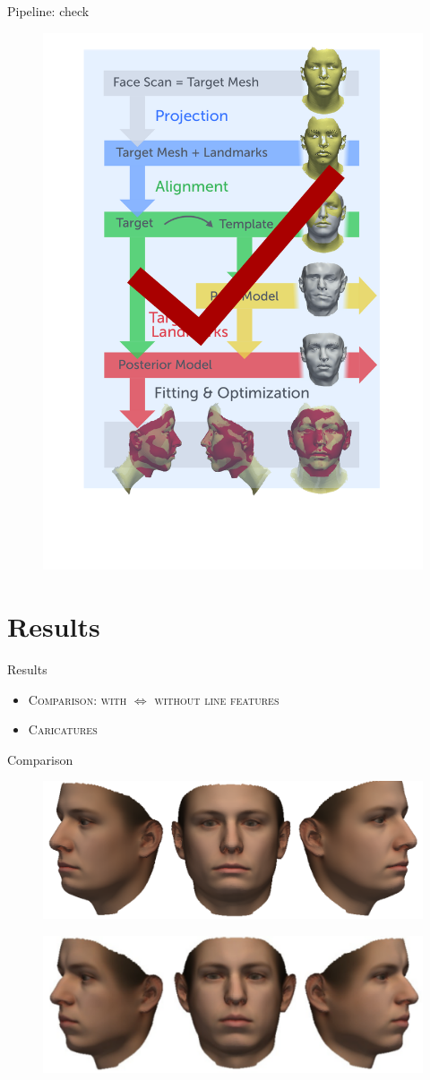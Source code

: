 \documentclass[xcolor=x11names,compress]{beamer}
\begin{document}
\begin{frame}{Pipeline: check}
\begin{figure}
    \includegraphics[width=.5\textwidth]{../resources/figures/pipeline_checked.pdf}
\end{figure}
\end{frame}

\section{Results}
\begin{frame}{Results}
\begin{itemize}
    \item    {\scshape Comparison: with $\Leftrightarrow$ without line features}
    \vfill
\item {\scshape Caricatures}
\end{itemize}
\end{frame}

\begin{frame}{Comparison}
    \begin{figure}
        \centering
        \includegraphics[width=.7\textwidth]{../resources/img/00303_fit_withoutlinefeatures.pdf}
    \end{figure}
    \begin{figure}
        \centering
        \includegraphics[width=.7\textwidth]{../resources/img/00303_fit.pdf}
    \end{figure}
\end{frame}
\end{document}
